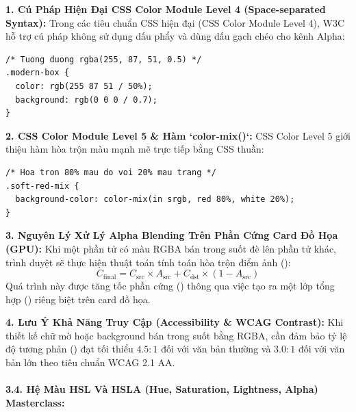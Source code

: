 \begin{prettyTableBox}
\textbf{1. Cú Pháp Hiện Đại CSS Color Module Level 4 (Space-separated Syntax):}
Trong các tiêu chuẩn CSS hiện đại (CSS Color Module Level 4), W3C hỗ trợ cú pháp không sử dụng dấu phẩy và dùng dấu gạch chéo \codeinline{/} cho kênh Alpha:
\begin{codeWindow}
\begin{lstlisting}[language=CSS3]
/* Tuong duong rgba(255, 87, 51, 0.5) */
.modern-box {
  color: rgb(255 87 51 / 50%);
  background: rgb(0 0 0 / 0.7);
}
\end{lstlisting}
\end{codeWindow}

\textbf{2. CSS Color Module Level 5 \& Hàm `color-mix()`:}
CSS Color Level 5 giới thiệu hàm hòa trộn màu mạnh mẽ trực tiếp bằng CSS thuần:
\begin{codeWindow}
\begin{lstlisting}[language=CSS3]
/* Hoa tron 80% mau do voi 20% mau trang */
.soft-red-mix {
  background-color: color-mix(in srgb, red 80%, white 20%);
}
\end{lstlisting}
\end{codeWindow}

\textbf{3. Nguyên Lý Xử Lý Alpha Blending Trên Phần Cứng Card Đồ Họa (GPU):}
Khi một phần tử có màu RGBA bán trong suốt đè lên phần tử khác, trình duyệt sẽ thực hiện thuật toán tính toán hòa trộn điểm ảnh ():
\[
C_{\text{final}} = C_{\text{src}} \times A_{\text{src}} + C_{\text{dst}} \times (1 - A_{\text{src}})
\]
Quá trình này được tăng tốc phần cứng () thông qua việc tạo ra một lớp tổng hợp () riêng biệt trên card đồ họa.

\textbf{4. Lưu Ý Khả Năng Truy Cập (Accessibility \& WCAG Contrast):}
Khi thiết kế chữ mờ hoặc background bán trong suốt bằng RGBA, cần đảm bảo tỷ lệ độ tương phản () đạt tối thiểu $4.5:1$ đối với văn bản thường và $3.0:1$ đối với văn bản lớn theo tiêu chuẩn WCAG 2.1 AA.
\end{prettyTableBox}

\paragraph{3.4. Hệ Màu HSL Và HSLA (Hue, Saturation, Lightness, Alpha) Masterclass:}

